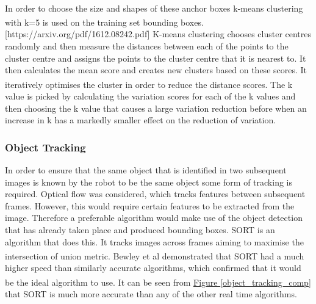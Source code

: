 \documentclass[11pt]{article}		%
\newcommand{\supercite}[1]{\textsuperscript{\cite{#1}}}		%
\newcommand{\figref}[1]{\hyperref[#1]{Figure \ref*{#1}}}    %
\begin{document}
	        \\
	        In order to choose the size and shapes of these anchor boxes k-means clustering with k=5 is used on the training set bounding boxes.\supercite{YOLOV2} [https://arxiv.org/pdf/1612.08242.pdf] K-means clustering chooses cluster centres randomly and then measure the distances between each of the points to the cluster centre and assigns the points to the cluster centre that it is nearest to. It then calculates the mean score and creates new clusters based on these scores. It iteratively optimises the cluster in order to reduce the distance scores.\supercite{k-means-clustering} The k value is picked by calculating the variation scores for each of the k values and then choosing the k value that causes a large variation reduction before when an increase in k has a markedly smaller effect on the reduction of variation. 
	
	        
	        \subsubsection{Object Tracking}
	        
	        In order to ensure that the same object that is identified in two subsequent images is known by the robot to be the same object some form of tracking is required. 
	        Optical flow was considered, which tracks features between subsequent frames.
	        However, this would require certain features to be extracted from the image. 
	        Therefore a preferable algorithm would make use of the object detection that has already taken place and produced bounding boxes. 
	        SORT is an algorithm that does this. 
	        It tracks images across frames aiming to maximise the intersection of union metric. 
	        Bewley et al \supercite{object_tracking} demonstrated that SORT had a much higher speed than similarly accurate algorithms, which confirmed that it would be the ideal algorithm to use.\supercite{object_tracking} It can be seen from \figref{object_tracking_comp} that SORT is much more accurate than any of the other real time algorithms.
	        
\end{document}
